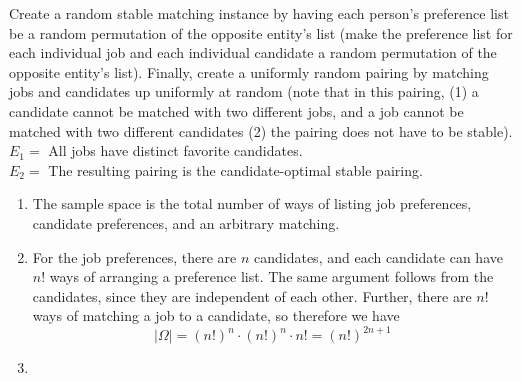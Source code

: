 \documentclass[11pt]{article}
\begin{document}
\begin{Parts}
    \Part Create a random stable matching instance by having each person's
    preference list be a random permutation of the opposite entity's list (make the preference list for each individual job and each individual candidate a random permutation of the opposite entity's list). Finally, create a uniformly random pairing by matching jobs and candidates up uniformly at random (note that in this pairing, (1) a candidate cannot be matched with two different jobs, and a job cannot be matched with two different candidates (2) the pairing does not have to be stable).\\
     $E_1 =$ All jobs have distinct favorite candidates.\\
     $E_2 =$ The resulting pairing is the candidate-optimal stable pairing.


     \begin{solution}
      \begin{enumerate}
        \item The sample space is the total number of ways of listing job preferences, candidate preferences, and an arbitrary matching. 
        \item For the job preferences, there are $n$ candidates, and each candidate can have $n!$ ways of arranging a preference list. The same argument follows from the candidates, since they are independent of each other. Further, there are $n!$ ways of matching a job to a candidate, so therefore we have 
        \[ |\Omega| = (n!)^n \cdot (n!)^n \cdot n! = (n!)^{2n + 1}\]
        \item
      \end{enumerate}
     \end{solution}
\end{Parts}
\end{document}
